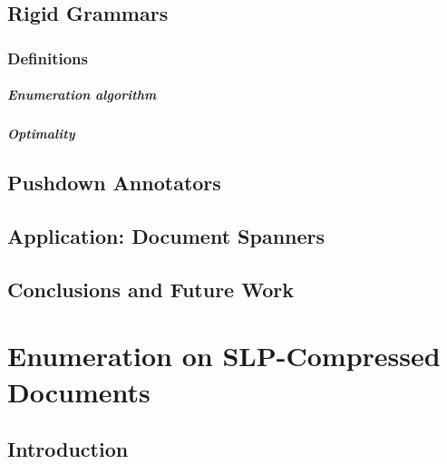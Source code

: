 \documentclass[pdftex]{pucthesis}	%
\begin{document}
\section{Rigid Grammars} \label{gram:sec:quadratic}


\subsection{Definitions}
\label{gram:sec:profile}


\paragraph{Enumeration algorithm}


\paragraph{Optimality}


\section{Pushdown Annotators} \label{gram:sec:linear}



\section{Application: Document Spanners} \label{gram:sec:spanners}

 

\section{Conclusions and Future Work}
 



\chapter[ENUMERATION ON SLP-COMPRESSED DOCUMENTS]{Enumeration on SLP-Compressed Documents} \label{ch3}

\section{Introduction}\label{slps:sec:introduction}
\end{document}
